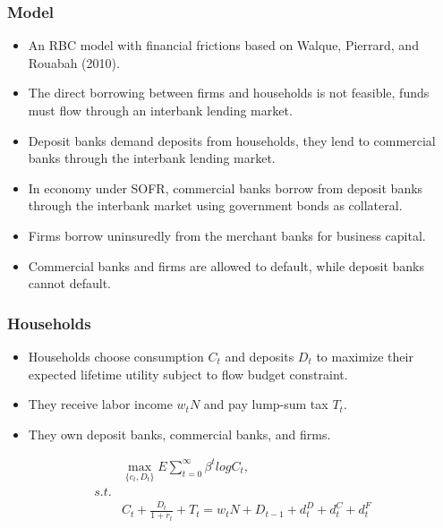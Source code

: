 \documentclass[10pt]{beamer}
\begin{document}
\begin{frame}
  \frametitle{Model}
  \begin{itemize}
    \item An RBC model with financial frictions based on Walque, Pierrard, and Rouabah (2010). 
    \item The direct borrowing between firms and households is not feasible, funds must flow through an interbank lending market.
    \item Deposit banks demand deposits from households, they lend to commercial banks through the interbank lending market.
    \item In economy under SOFR, commercial banks borrow from deposit banks through the interbank market using government bonds as collateral.
    \item Firms borrow uninsuredly from the merchant banks for business capital.
    \item Commercial banks and firms are allowed to default, while deposit banks cannot default.
  \end{itemize}
\end{frame}



\begin{frame}
  \frametitle{Households}
  \begin{itemize}
    \item Households choose consumption $C_t$ and deposits $D_t$ to maximize their expected lifetime utility subject to flow budget constraint.
    \item They receive labor income $w_tN$ and pay lump-sum tax $T_t$.
    \item They own deposit banks, commercial banks, and firms.
  \end{itemize}
  \begin{align}
    &\max_{\{c_t, D_t\}} E \sum_{t=0}^{\infty} \beta^t logC_t ,\\
    s.t. \nonumber \\
    &C_t+\frac{D_t}{1+r_t}+T_t=w_tN+D_{t-1}+d_t^D+d_t^C+d_t^F
  \end{align}
\end{frame}
\end{document}
